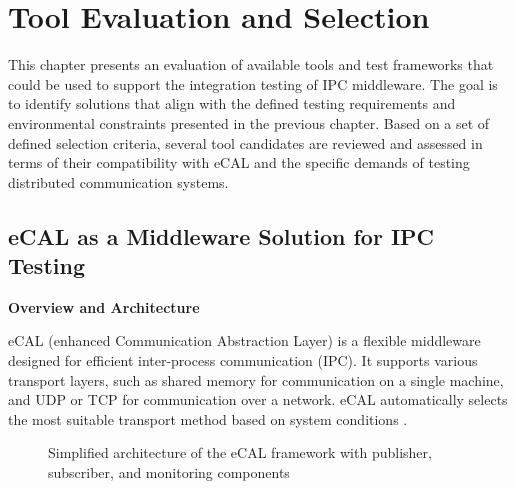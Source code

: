 \clearpage
\section{Tool Evaluation and Selection}

This chapter presents an evaluation of available tools and test frameworks that could be used to support the integration testing of IPC middleware. The goal is to identify solutions that align with the defined testing requirements and environmental constraints presented in the previous chapter. Based on a set of defined selection criteria, several tool candidates are reviewed and assessed in terms of their compatibility with eCAL and the specific demands of testing distributed communication systems.

\subsection{eCAL as a Middleware Solution for IPC Testing}

\textbf{Overview and Architecture}

\vspace{0.4em}
eCAL (enhanced Communication Abstraction Layer) is a flexible middleware designed for efficient inter-process communication (IPC). It supports various transport layers, such as shared memory for communication on a single machine, and UDP or TCP for communication over a network. eCAL automatically selects the most suitable transport method based on system conditions \cite{ecal_official_docs}.


\vspace{1em}
\begin{figure}[H]
	\centering
	\caption{Simplified architecture of the eCAL framework with publisher, subscriber, and monitoring components}
	\label{fig:ecal_architecture}
\end{figure}

